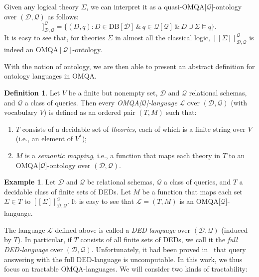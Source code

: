 \documentclass[letterpaper]{article} %
\theoremstyle{definition}
\newtheorem{defn}{Definition}
\theoremstyle{remark}
\theoremstyle{definition}
\newtheorem{exm}{Example}
\begin{document}
Given any logical theory $\Sigma$, we can interpret it as a quasi-OMQA[$\mathcal{Q}$]-ontology over $(\mathscr{D},\mathscr{Q})$ as follows:
\begin{equation*}
[\![\Sigma]\!]_{\mathscr{D},\mathscr{Q}}^{\mathcal{Q}}=\{(D,{q}):D\!\in\!\text{DB}[\mathscr{D}]\,\&\,q\!\in\!\mathcal{Q}[\mathscr{Q}]\,\&\,D\cup\Sigma\vDash{q}\}.
\end{equation*}
It is easy to see that, for theories $\Sigma$ in almost all the classical logic, $[\![\Sigma]\!]_{\mathscr{D},\mathscr{Q}}^\mathcal{Q}$ is indeed an OMQA$[\mathcal{Q}]$-ontology.

With the notion of ontology, we are then able to present an abstract definition for ontology languages in OMQA. 
\begin{defn}
Let $V$ be a finite but nonempty set, $\mathscr{D}$ and $\mathscr{Q}$ relational schemas, and $\mathcal{Q}$ a class of queries. Then every {\em OMQA[$\mathcal{Q}$]-language} $\mathcal{L}$ over $(\mathscr{D},\mathscr{Q})$ (with vocabulary $V$) is defined as an ordered pair $(T, M)$ such that:
\begin{enumerate}
\item ${T}$ consists of a decidable set of {\em theories}, each of which is a finite string over $V$ (i.e., an element of $V^\ast$);
\item ${M}$ is a {\em semantic mapping}, i.e., a function that maps each theory in ${T}$ to an OMQA[$\mathcal{Q}$]-ontology over $(\mathscr{D},\mathscr{Q})$.
\end{enumerate}
\end{defn}

\begin{exm}\label{exm:ded}
Let $\mathscr{D}$ and $\mathscr{Q}$ be relational schemas, $\mathcal{Q}$ a class of queries, and $T$ a decidable class of finite sets of DEDs. Let $M$ be a function that maps each set $\Sigma\in T$ to $[\![\Sigma]\!]_{\mathscr{D},\mathscr{Q}}^{\mathcal{Q}}$.
It is easy to see that $\mathcal{L}=(T,M)$ is an OMQA[$\mathcal{Q}$]-language.  
\end{exm}

The language $\mathcal{L}$ defined above is called a {\em DED-language} over $(\mathscr{D},\mathscr{Q})$ (induced by $T$). In particular, if $T$ consists of all finite sets of DEDs, we call it the {\em full DED-language} over $(\mathscr{D},\mathscr{Q})$. Unfortunately, it had been proved in~\cite{Vardi1982} that query answering with the full DED-language is uncomputable. In this work, we thus focus on tractable OMQA-languages. We will consider two kinds of tractability: 
\end{document}
